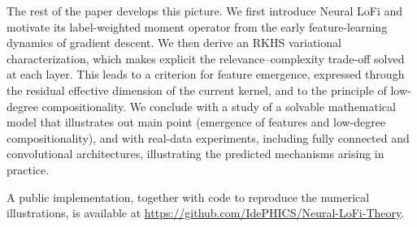 The rest of the paper develops this picture. We first introduce Neural LoFi and motivate its label-weighted moment operator from the early feature-learning dynamics of gradient descent. We then derive an RKHS variational characterization, which makes explicit the relevance--complexity trade-off solved at each layer. This leads to a criterion for feature emergence, expressed through the residual effective dimension of the current kernel, and to the principle of low-degree compositionality. We conclude with a study of a solvable mathematical model that illustrates out main point (emergence of features and low-degree compositionality), and with real-data experiments, including fully connected and convolutional architectures, illustrating the predicted mechanisms arising in practice.

A public implementation, together with code to reproduce the numerical illustrations, is available at
\url{https://github.com/IdePHICS/Neural-LoFi-Theory}.
